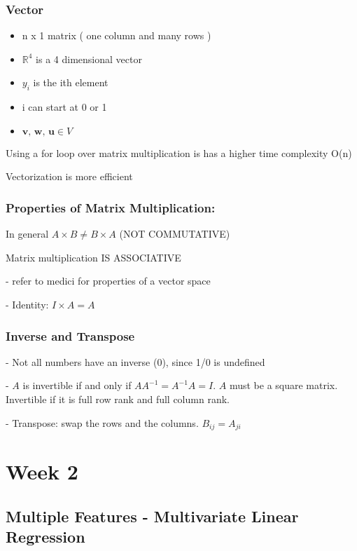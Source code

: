\documentclass{article}
\begin{document}
\hspace{}

\subsubsection{Vector}
\begin{itemize}
    \item n x 1 matrix ( one column and many rows )
    \item $\mathbb{R}^4$ is a 4 dimensional vector
    \item $y_i$ is the ith element 
    \item i can start at 0 or 1 
    \item $\textbf{v, w, u} \in V$
\end{itemize}


Using a for loop over matrix multiplication is has a higher time complexity O(n)

Vectorization is more efficient 


\subsubsection{Properties of Matrix Multiplication:}

In general $ A \times B \neq B \times A$
(NOT COMMUTATIVE)


Matrix multiplication IS ASSOCIATIVE 

- refer to medici for properties of a vector space 

- Identity: $I \times A = A$


\subsubsection{Inverse and Transpose}

- Not all numbers have an inverse (0), since 1/0 is undefined

- $A$ is invertible if and only if $A A^{-1} = A^{-1}A = I$. $A$ must be a square matrix. Invertible if it is full row rank and full column rank.



- Transpose: swap the rows and the columns. $B_{ij} = A_{ji}$



\section{Week 2}

\subsection{Multiple Features - Multivariate Linear Regression}
\end{document}
